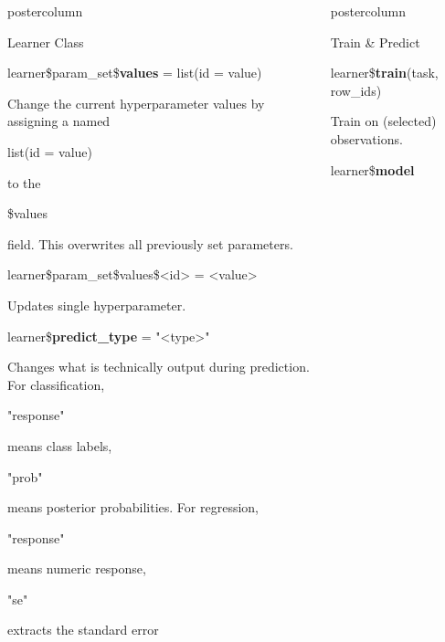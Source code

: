 \documentclass{beamer}
\newlength{\columnheight} %
\newcommand{\codeinline}[1]{\begin{codeboxinline}#1\end{codeboxinline}}
\begin{document}
\begin{frame}[fragile]{}
\begin{columns}
\begin{column}{.245\textwidth}
\begin{beamercolorbox}[center]{postercolumn}
\begin{minipage}{.98\textwidth}
{\begin{myblock}{Learner Class}
						\begin{codebox}
							learner\$param\_set\$\textbf{values} = list(id = value)
						\end{codebox}
						Change the current hyperparameter values by assigning a named \codeinline{list(id = value)} to the \codeinline{\$values} field.
						This overwrites all previously set parameters.	
						\\
						\begin{codebox}
							learner\$param\_set\$values\$<id> = <value>
						\end{codebox}
						Updates single hyperparameter.
						\vspace{1em}
						\\
						\begin{codebox}
							learner\$\textbf{predict\_type} = "<type>"
						\end{codebox}
						Changes what is technically output during prediction. For classification, 
                        \codeinline{"response"} means class labels, \codeinline{"prob"} means posterior probabilities. For regression, \codeinline{"response"} means numeric response, 
                        \codeinline{"se"} extracts the standard error 
						\vspace{1em}
					\end{myblock}
					\vfill
					}
				\end{minipage}
			\end{beamercolorbox}
		\end{column}
		\begin{column}{.245\textwidth}
			\begin{beamercolorbox}[center]{postercolumn}
				\begin{minipage}{.98\textwidth}
					\parbox[t][\columnheight]{\textwidth}{
						\begin{myblock}{Train \& Predict}
						\begin{codebox}
							learner\$\textbf{train}(task, row\_ids)
						\end{codebox}
                        Train on (selected) observations. 
						\\
						\begin{codebox}
							learner\$\textbf{model}
						\end{codebox}

\end{myblock}}
\end{minipage}
\end{beamercolorbox}
\end{column}
\end{columns}
\end{frame}
\end{document}

